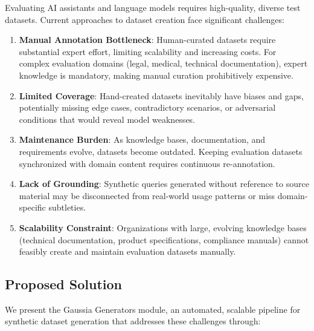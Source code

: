 \documentclass[11pt,a4paper]{article}
\begin{document}
Evaluating AI assistants and language models requires high-quality, diverse test datasets. Current approaches to dataset creation face significant challenges:

\begin{enumerate}
    \item \textbf{Manual Annotation Bottleneck}: Human-curated datasets require substantial expert effort, limiting scalability and increasing costs. For complex evaluation domains (legal, medical, technical documentation), expert knowledge is mandatory, making manual curation prohibitively expensive.

    \item \textbf{Limited Coverage}: Hand-created datasets inevitably have biases and gaps, potentially missing edge cases, contradictory scenarios, or adversarial conditions that would reveal model weaknesses.

    \item \textbf{Maintenance Burden}: As knowledge bases, documentation, and requirements evolve, datasets become outdated. Keeping evaluation datasets synchronized with domain content requires continuous re-annotation.

    \item \textbf{Lack of Grounding}: Synthetic queries generated without reference to source material may be disconnected from real-world usage patterns or miss domain-specific subtleties.

    \item \textbf{Scalability Constraint}: Organizations with large, evolving knowledge bases (technical documentation, product specifications, compliance manuals) cannot feasibly create and maintain evaluation datasets manually.
\end{enumerate}

\subsection{Proposed Solution}

We present the Gaussia Generators module, an automated, scalable pipeline for synthetic dataset generation that addresses these challenges through:
\end{document}
